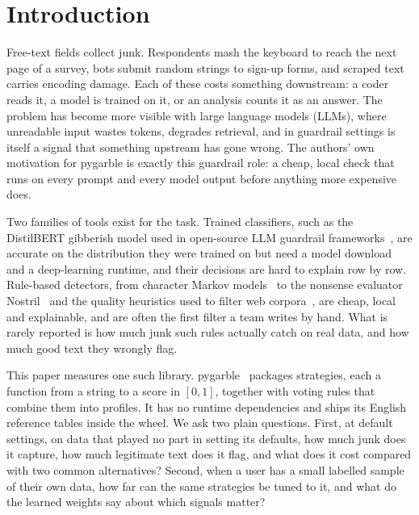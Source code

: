 \documentclass[10pt,twocolumn]{article}
\begin{document}
\section{Introduction}

Free-text fields collect junk. Respondents mash the keyboard to reach the
next page of a survey, bots submit random strings to sign-up forms, and
scraped text carries encoding damage. Each of these costs something
downstream: a coder reads it, a model is trained on it, or an analysis
counts it as an answer. The problem has become more visible with large
language models (LLMs), where unreadable input wastes tokens, degrades
retrieval, and in guardrail settings is itself a signal that something
upstream has gone wrong. The authors' own motivation for pygarble is
exactly this guardrail role: a cheap, local check that runs on every
prompt and every model output before anything more expensive does.

Two families of tools exist for the task. Trained classifiers, such as
the DistilBERT gibberish model used in open-source LLM guardrail
frameworks~\citep{madhurjindal}, are accurate on the distribution they
were trained on but need a model download and a deep-learning runtime,
and their decisions are hard to explain row by row. Rule-based detectors,
from character Markov models~\citep{gibberishdetector} to the nonsense
evaluator Nostril~\citep{hucka2018nostril} and the quality heuristics used
to filter web corpora~\citep{rae2021gopher,raffel2020t5}, are cheap,
local and explainable, and are often the first filter a team writes by
hand. What is rarely reported is how much junk such rules actually catch
on real data, and how much good text they wrongly flag.

This paper measures one such library. pygarble~\citep{pygarble} packages
\nstrategies{} strategies, each a function from a string to a score in
$[0,1]$, together with voting rules that combine them into profiles. It
has no runtime dependencies and ships its English reference tables inside
the wheel. We ask two plain questions. First, at default settings, on
data that played no part in setting its defaults, how much junk does it
capture, how much legitimate text does it flag, and what does it cost
compared with two common alternatives? Second, when a user has a small
labelled sample of their own data, how far can the same strategies be
tuned to it, and what do the learned weights say about which signals
matter?
\end{document}
